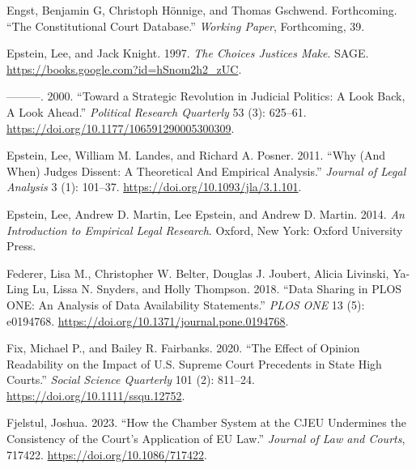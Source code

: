 \documentclass[
  11pt,
]{article}
\newlength{\cslhangindent}
\newenvironment{CSLReferences}[2] %
 {%
  \setlength{\parindent}{0pt}
  \ifodd #1 \everypar{\setlength{\hangindent}{\cslhangindent}}\ignorespaces\fi
  \ifnum #2 > 0
  \setlength{\parskip}{#2\baselineskip}
  \fi
 }%
 {}
\begin{document}
\begin{CSLReferences}{1}{0}
\leavevmode{}%
Engst, Benjamin G, Christoph Hönnige, and Thomas Gschwend. Forthcoming.
{``The {Constitutional Court Database}.''} \emph{Working Paper},
Forthcoming, 39.

\leavevmode{}%
Epstein, Lee, and Jack Knight. 1997. \emph{The {Choices Justices Make}}.
{SAGE}. \url{https://books.google.com?id=hSnom2h2_zUC}.

\leavevmode{}%
---------. 2000. {``Toward a {Strategic Revolution} in {Judicial
Politics}: {A Look Back}, {A Look Ahead}.''} \emph{Political Research
Quarterly} 53 (3): 625--61.
\url{https://doi.org/10.1177/106591290005300309}.

\leavevmode{}%
Epstein, Lee, William M. Landes, and Richard A. Posner. 2011. {``Why
({And When}) {Judges Dissent}: {A Theoretical And Empirical
Analysis}.''} \emph{Journal of Legal Analysis} 3 (1): 101--37.
\url{https://doi.org/10.1093/jla/3.1.101}.

\leavevmode{}%
Epstein, Lee, Andrew D. Martin, Lee Epstein, and Andrew D. Martin. 2014.
\emph{An {Introduction} to {Empirical Legal Research}}. {Oxford, New
York}: {Oxford University Press}.

\leavevmode{}%
Federer, Lisa M., Christopher W. Belter, Douglas J. Joubert, Alicia
Livinski, Ya-Ling Lu, Lissa N. Snyders, and Holly Thompson. 2018.
{``Data Sharing in {PLOS ONE}: {An} Analysis of {Data Availability
Statements}.''} \emph{PLOS ONE} 13 (5): e0194768.
\url{https://doi.org/10.1371/journal.pone.0194768}.

\leavevmode{}%
Fix, Michael P., and Bailey R. Fairbanks. 2020. {``The {Effect} of
{Opinion Readability} on the {Impact} of {U}.{S}. {Supreme Court
Precedents} in {State High Courts}.''} \emph{Social Science Quarterly}
101 (2): 811--24. \url{https://doi.org/10.1111/ssqu.12752}.

\leavevmode{}%
Fjelstul, Joshua. 2023. {``How the {Chamber System} at the {CJEU
Undermines} the {Consistency} of the {Court}'s {Application} of {EU
Law}.''} \emph{Journal of Law and Courts}, 717422.
\url{https://doi.org/10.1086/717422}.


\end{CSLReferences}
\end{document}
